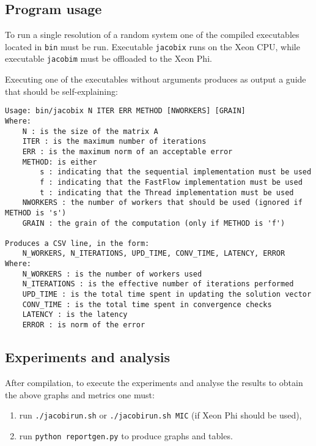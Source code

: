 \subsection{Program usage}
To run a single resolution of a random system one of the compiled executables located in \verb|bin| must be run.
Executable \verb|jacobix| runs on the Xeon CPU, while executable \verb|jacobim| must be offloaded to the Xeon Phi.

Executing one of the executables without arguments produces as output a guide that should be self-explaining:
\begin{lstlisting}
Usage: bin/jacobix N ITER ERR METHOD [NWORKERS] [GRAIN]
Where: 
	N : is the size of the matrix A
	ITER : is the maximum number of iterations
	ERR : is the maximum norm of an acceptable error
	METHOD: is either
		s : indicating that the sequential implementation must be used
		f : indicating that the FastFlow implementation must be used
		t : indicating that the Thread implementation must be used
	NWORKERS : the number of workers that should be used (ignored if METHOD is 's')
	GRAIN : the grain of the computation (only if METHOD is 'f')

Produces a CSV line, in the form:
	N_WORKERS, N_ITERATIONS, UPD_TIME, CONV_TIME, LATENCY, ERROR
Where:
	N_WORKERS : is the number of workers used
	N_ITERATIONS : is the effective number of iterations performed
	UPD_TIME : is the total time spent in updating the solution vector
	CONV_TIME : is the total time spent in convergence checks
	LATENCY : is the latency
	ERROR : is norm of the error
\end{lstlisting}

\subsection{Experiments and analysis}\label{subsec:runningexperiments}
After compilation, to execute the experiments and analyse the results to obtain the above graphs and metrics one must:
\begin{enumerate}
	\item run \verb|./jacobirun.sh| or \verb|./jacobirun.sh MIC| (if Xeon Phi should be used), 
	\item run \verb|python reportgen.py| to produce graphs and tables.
\end{enumerate}